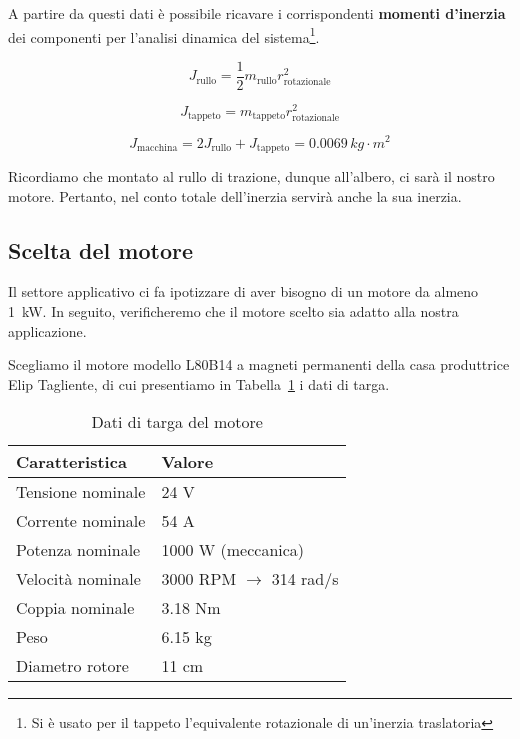 \documentclass[a4paper,12pt]{article}
\begin{document}
A partire da questi dati è possibile ricavare i corrispondenti \textbf{momenti d'inerzia} dei componenti per l'analisi dinamica del sistema\footnote{Si è usato per il tappeto l'equivalente rotazionale di un'inerzia traslatoria}.

\vspace{0.5cm}

\[
    J_{\text{rullo}} = \frac{1}{2} m_{\text{rullo}} r_{\text{rotazionale}}^2
\]

\[
    J_{\text{tappeto}} = m_{\text{tappeto}} r_{\text{rotazionale}}^2
\]

\[
    J_{\text{macchina}} = 2 J_{\text{rullo}} + J_{\text{tappeto}} = 0.0069\, kg\cdot m^2
\]

\vspace{0.5cm}

Ricordiamo che montato al rullo di trazione, dunque all'albero, ci sarà il nostro motore. Pertanto, nel conto totale dell'inerzia servirà anche la sua inerzia.


\subsection{Scelta del motore}

Il settore applicativo ci fa ipotizzare di aver bisogno di un motore da almeno 1~kW. In seguito, verificheremo che il motore scelto sia adatto alla nostra applicazione.

\vspace{0.5em} 

Scegliamo il motore modello L80B14 a magneti permanenti della casa produttrice Elip Tagliente, di cui presentiamo in Tabella~\ref{tab: datiTargaMotore} i dati di targa.

\vspace{0.3em} 

\begin{table}[h!]
    \centering
    \begin{tabular}{|l|l|}
    \hline
    \textbf{Caratteristica} & \textbf{Valore} \\ \hline
    Tensione nominale & 24 V \\ \hline
    Corrente nominale & 54 A \\ \hline
    Potenza nominale & 1000 W (meccanica) \\ \hline
    Velocità nominale & 3000 RPM \(\rightarrow\) 314 rad/s \\ \hline
    Coppia nominale & 3.18 Nm \\ \hline
    Peso & 6.15 kg \\ \hline
    Diametro rotore & 11 cm \\ \hline
    \end{tabular}
    \caption{Dati di targa del motore}
    \label{tab: datiTargaMotore}
\end{table}
\end{document}
